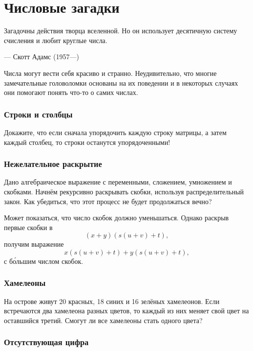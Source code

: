 \chapter{Числовые загадки}



\setlength{\epigraphwidth}{.70\textwidth}
\epigraph{Загадочны действия творца вселенной.
Но он использует десятичную систему счисления и любит круглые
числа.
}{--- Скотт Адамс (1957---)}

Числа могут вести себя красиво и странно.
Неудивительно, что многие замечательные головоломки основаны на их поведении и в некоторых случаях они помогают понять что-то о самих числах.

\subsection*{Строки и столбцы}

Докажите, что если сначала упорядочить каждую строку матрицы, а затем каждый столбец, то строки останутся упорядоченными!

\subsection*{Нежелательное раскрытие}

Дано алгебраическое выражение с переменными, сложением, умножением и скобками.
Начнём рекурсивно раскрывать скобки, используя распределительный закон.
Как убедиться, что этот процесс не будет продолжаться вечно?

Может показаться, что число скобок должно уменьшаться.
Однако раскрыв первые скобки в
\[(x + y)(s(u + v) + t),\]
получим выражение
\[x(s(u + v) + t) + y(s(u + v) + t),\]
с б\'{о}льшим числом скобок.

\subsection*{Хамелеоны}\label{Хамелеоны}

На острове живут 20 красных, 18 синих и 16 зелёных хамелеонов.
Если встречаются два хамелеона разных цветов, то каждый из них меняет свой цвет на оставшийся третий.
Смогут ли все хамелеоны стать одного цвета?

\subsection*{Отсутствующая цифра}

